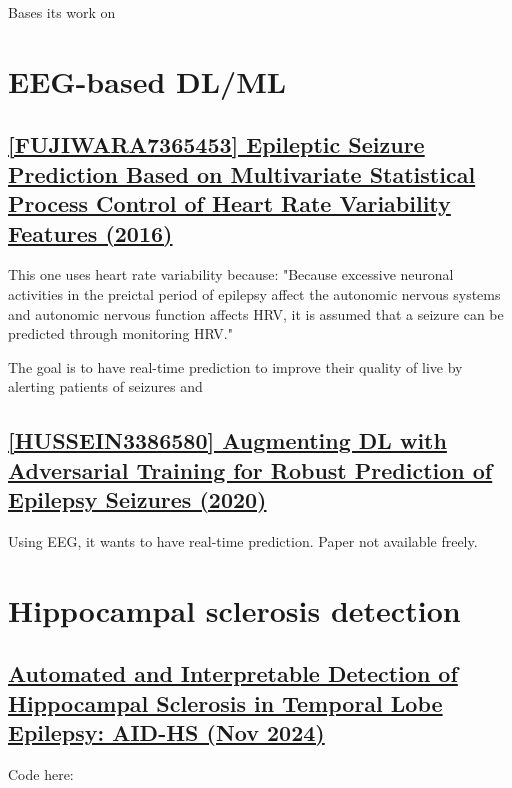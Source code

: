 Bases its work on 

\newpage
\section{EEG-based DL/ML}

\subsection{\href{https://ieeexplore.ieee.org/abstract/document/7365453}{[FUJIWARA7365453] Epileptic Seizure Prediction Based on Multivariate Statistical Process Control of Heart Rate Variability Features (2016) }}

This one uses heart rate variability because: "Because excessive neuronal activities in the preictal period of epilepsy affect the autonomic nervous systems and autonomic nervous function affects HRV, it is assumed that a seizure can be predicted through monitoring HRV."

The goal is to have real-time prediction to improve their quality of live by alerting patients of seizures and 

\newpage
\subsection{\href{https://dl.acm.org/doi/abs/10.1145/3386580}{[HUSSEIN3386580] Augmenting DL with Adversarial Training for Robust Prediction of Epilepsy Seizures (2020) }}

Using EEG, it wants to have real-time prediction. Paper not available freely.

\newpage
\section{Hippocampal sclerosis detection}
\label{hs}

\subsection{\href{https://onlinelibrary.wiley.com/doi/full/10.1002/ana.27089}{Automated and Interpretable Detection of Hippocampal Sclerosis in Temporal Lobe Epilepsy: AID-HS (Nov 2024)}}
\label{hs1}

Code here: 

